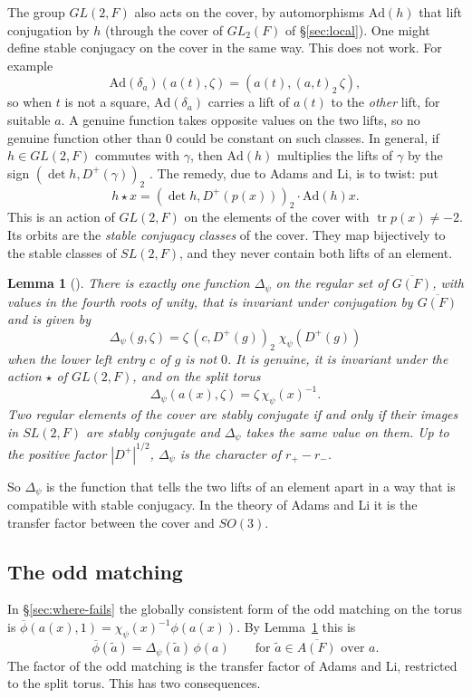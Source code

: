 \documentclass[12pt,letterpaper,openany]{book}
\theoremstyle{plain}
\newtheorem{lemma}[theorem]{Lemma}
\theoremstyle{definition}
\theoremstyle{remark}
\theoremstyle{remark}
\newcommand{\tr}{\operatorname{tr}}
\begin{document}
The group $GL(2,F)$ also acts on the cover, by automorphisms
$\mathrm{Ad}(h)$ that lift conjugation by $h$ (through the cover of
$GL_2(F)$ of \S\ref{sec:local}). One might define stable conjugacy on the
cover in the same way. This does not work. For example
\[
\mathrm{Ad}(\delta_a)(a(t),\zeta)=(a(t),(a,t)_2\,\zeta),
\]
so when $t$ is not a square, $\mathrm{Ad}(\delta_a)$ carries a lift of
$a(t)$ to the \emph{other} lift, for suitable $a$. A genuine function
takes opposite values on the two lifts, so no genuine function other
than $0$ could be constant on such classes. In general, if $h\in GL(2,F)$
commutes with $\gamma$, then $\mathrm{Ad}(h)$ multiplies the lifts of
$\gamma$ by the sign $(\det h,D^+(\gamma))_2$ \cite[Lemma~7.2]{JC}. The
remedy, due to Adams \cite{Ad2} and Li, is to twist: put
\[
h\star x=(\det h,D^+(p(x)))_2\cdot\mathrm{Ad}(h)x .
\]
This is an action of $GL(2,F)$ on the elements of the cover with
$\tr p(x)\neq-2$. Its orbits are the \emph{stable conjugacy classes} of
the cover. They map bijectively to the stable classes of $SL(2,F)$, and
they never contain both lifts of an element.

\begin{lemma}[{\cite[Lemma~7.3]{JC}}]\label{lem:Delta}
There is exactly one function $\Delta_\psi$ on the regular set of
$\overline{G(F)}$, with values in the fourth roots of unity, that is
invariant under conjugation by $\overline{G(F)}$ and is given by
\[
\Delta_\psi(g,\zeta)=\zeta\,(c,D^+(g))_2\;\chi_\psi(D^+(g))
\]
when the lower left entry $c$ of $g$ is not $0$. It is genuine, it is
invariant under the action $\star$ of $GL(2,F)$, and on the split torus
\[
\Delta_\psi(a(x),\zeta)=\zeta\,\chi_\psi(x)^{-1}.
\]
Two regular elements of the cover are stably conjugate if and only if
their images in $SL(2,F)$ are stably conjugate and $\Delta_\psi$ takes
the same value on them. Up to the positive factor $|D^+|^{1/2}$,
$\Delta_\psi$ is the character of $r_+-r_-$.
\end{lemma}

So $\Delta_\psi$ is the function that tells the two lifts of an element
apart in a way that is compatible with stable conjugacy. In the theory of
Adams and Li it is the transfer factor between the cover and $SO(3)$.

\subsection*{The odd matching}

In \S\ref{sec:where-fails} the globally consistent form of the odd
matching on the torus is
$\overline\phi(a(x),1)=\chi_\psi(x)^{-1}\phi(a(x))$. By
Lemma~\ref{lem:Delta} this is
\begin{equation}\label{eq:odd-Delta}
\overline\phi(\tilde a)=\Delta_\psi(\tilde a)\,\phi(a)\qquad
\text{for }\tilde a\in\overline{A(F)}\text{ over }a .
\end{equation}
The factor of the odd matching is the transfer factor of Adams and Li,
restricted to the split torus. This has two consequences.
\end{document}
